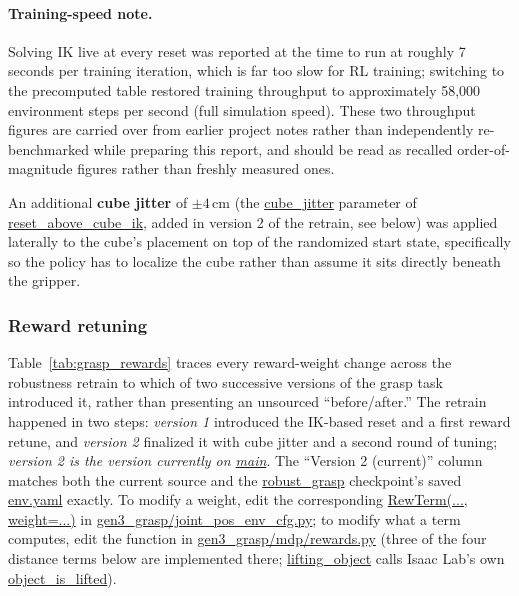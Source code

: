 \documentclass[11pt]{article}
\begin{document}
\paragraph{Training-speed note.} Solving IK live at every reset was reported at the
time to run at roughly 7 seconds per training iteration, which is far too slow for
RL training; switching to the precomputed table restored training throughput to
approximately 58{,}000 environment steps per second (full simulation speed). These
two throughput figures are carried over from earlier project notes rather than
independently re-benchmarked while preparing this report, and should be read as
recalled order-of-magnitude figures rather than freshly measured ones.

An additional \textbf{cube jitter} of $\pm4$\,cm (the \url{cube_jitter} parameter
of \url{reset_above_cube_ik}, added in version 2 of the retrain, see below) was
applied laterally to the cube's placement on top of the randomized start state,
specifically so the policy has to localize the cube rather than assume it sits
directly beneath the gripper.

\subsubsection{Reward retuning}
\label{sec:grasp_reward_retune}

Table~\ref{tab:grasp_rewards} traces every reward-weight change across the
robustness retrain to which of two successive versions of the grasp task
introduced it, rather than presenting an unsourced ``before/after.'' The retrain
happened in two steps: \emph{version 1} introduced the IK-based reset and a first
reward retune, and \emph{version 2} finalized it with cube jitter and a second
round of tuning; \emph{version 2 is the version currently on \url{main}}. The
``Version 2 (current)'' column matches both the current source and the
\url{robust_grasp} checkpoint's saved
\url{env.yaml} exactly. To modify a weight, edit the corresponding
\url{RewTerm(..., weight=...)} in \url{gen3_grasp/joint_pos_env_cfg.py};
to modify what a term computes, edit the function in
\url{gen3_grasp/mdp/rewards.py} (three of the four distance terms below are
implemented there; \url{lifting_object} calls Isaac Lab's own
\url{object_is_lifted}).
\end{document}
